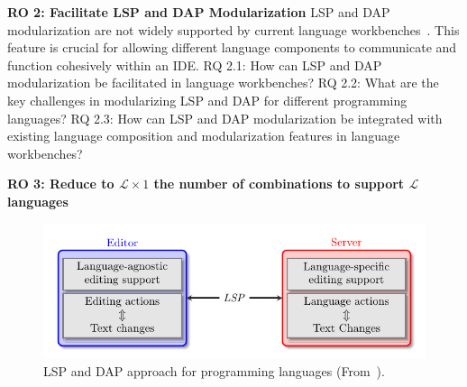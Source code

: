 \hfill \break
\noindent
\textbf{\hypertarget{ro2}{RO 2}: Facilitate LSP and DAP Modularization}
\hfill \break
LSP and DAP modularization are not widely supported by current language workbenches~\cite{Bunder19a}. This feature is crucial for allowing different language components to communicate and function cohesively within an IDE.
\hfill \break
\textsf{\hypertarget{rq21}{RQ 2.1}}: How can LSP and DAP modularization be facilitated in language workbenches?
\hfill \break
\textsf{\hypertarget{rq22}{RQ 2.2}}: What are the key challenges in modularizing LSP and DAP for different programming languages?
\hfill \break
\textsf{\hypertarget{rq23}{RQ 2.3}}: How can LSP and DAP modularization be integrated with existing language composition and modularization features in language workbenches?

\hfill \break
\noindent
\textbf{\hypertarget{ro3}{RO 3}: Reduce to $\mathcal{L} \times 1$ the number of combinations to support $\mathcal{L}$ languages}

\begin{figure}[t]
    \centering
    \includegraphics[width=0.75\linewidth]{figs/lsp_agnostic.pdf}
    \caption{LSP and DAP approach for programming languages (From~\cite{Rodriguez-Echeverria18a}).}
    \label{fig:agnostic}
\end{figure}

